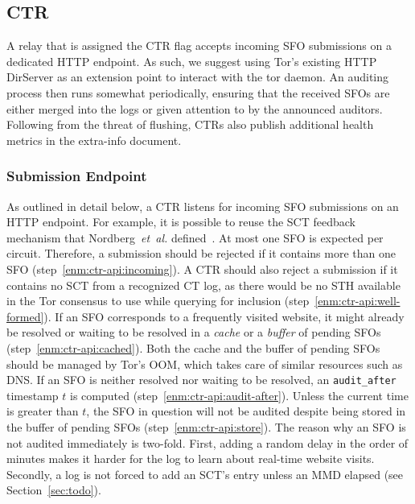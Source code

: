 %
%

\subsection{CTR}
A relay that is assigned the CTR flag accepts incoming SFO submissions on a
dedicated HTTP endpoint.  As such, we suggest using Tor's existing HTTP
DirServer as an extension point to interact with the tor daemon.  An auditing
process then runs somewhat periodically, ensuring that the received SFOs are
either merged into the logs or given attention to by the announced auditors.
Following from the threat of flushing, CTRs also publish additional health
metrics in the extra-info document.

\subsubsection{Submission Endpoint}
As outlined in detail below, a CTR listens for incoming SFO submissions on an
HTTP endpoint.  For example, it is possible to reuse the SCT feedback mechanism
that Nordberg~\emph{et~al.} defined~\cite{nordberg}.  At most one SFO is
expected per circuit.  Therefore, a submission should be rejected if it
contains more than one SFO (step~\ref{enm:ctr-api:incoming}).
A CTR should also reject a submission if it contains no SCT from a recognized CT
log, as there would be no STH available in the Tor consensus to use while
querying for inclusion (step~\ref{enm:ctr-api:well-formed}).
If an SFO corresponds to a frequently visited website, it might already be
resolved or waiting to be resolved in a \emph{cache} or a \emph{buffer} of
pending SFOs (step~\ref{enm:ctr-api:cached}).
Both the cache and the buffer of pending SFOs should be managed by Tor's OOM,
which takes care of similar resources such as DNS.  If an SFO is neither
resolved nor waiting to be resolved, an \texttt{audit\_after} timestamp $t$ is
computed (step~\ref{enm:ctr-api:audit-after}).
Unless the current time is greater than $t$, the SFO in question will not be
audited despite being stored in the buffer of pending SFOs
(step~\ref{enm:ctr-api:store}).
The reason why an SFO is not audited immediately is two-fold.  First, adding a
random delay in the order of minutes makes it harder for the log to learn about
real-time website visits.  Secondly, a log is not forced to add an SCT's entry
unless an MMD elapsed (see Section~\ref{sec:todo}).

